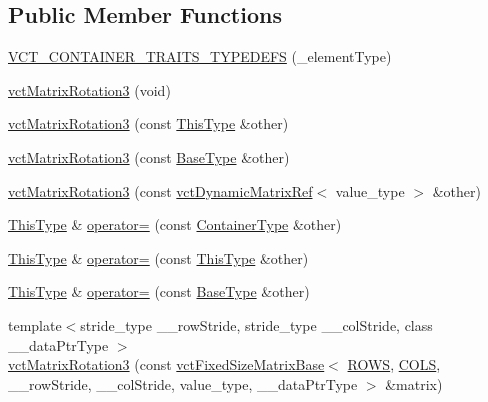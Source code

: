 \subsection*{Public Member Functions}
\begin{DoxyCompactItemize}
\item 
\hyperlink{classvct_matrix_rotation3_adbe5f2fc2338162c07322041a96e7c5c}{V\+C\+T\+\_\+\+C\+O\+N\+T\+A\+I\+N\+E\+R\+\_\+\+T\+R\+A\+I\+T\+S\+\_\+\+T\+Y\+P\+E\+D\+E\+F\+S} (\+\_\+element\+Type)
\item 
\hyperlink{classvct_matrix_rotation3_aa18a0aba9e5afb41c1279492d334cdcc}{vct\+Matrix\+Rotation3} (void)
\item 
\hyperlink{classvct_matrix_rotation3_af4d1ec8d30bccf86b158c2720e8bc735}{vct\+Matrix\+Rotation3} (const \hyperlink{classvct_fixed_size_const_matrix_base_a7ec66a96ed7e08ce9ff54093133c9d8d}{This\+Type} \&other)
\item 
\hyperlink{classvct_matrix_rotation3_a289c3541f606afd5b62b3df5da5f3c45}{vct\+Matrix\+Rotation3} (const \hyperlink{classvct_matrix_rotation3_a548c9a746fae0bfb7b4b1466a872f4dd}{Base\+Type} \&other)
\item 
\hyperlink{classvct_matrix_rotation3_a8c056c071df209ca53bc3ff8cb0a6a56}{vct\+Matrix\+Rotation3} (const \hyperlink{classvct_dynamic_matrix_ref}{vct\+Dynamic\+Matrix\+Ref}$<$ value\+\_\+type $>$ \&other)
\item 
\hyperlink{classvct_fixed_size_const_matrix_base_a7ec66a96ed7e08ce9ff54093133c9d8d}{This\+Type} \& \hyperlink{classvct_matrix_rotation3_aa9706d895d226eae4becea140501217c}{operator=} (const \hyperlink{classvct_matrix_rotation3_a1f8796d5368dbda35c3b57c6395b6dd0}{Container\+Type} \&other)
\item 
\hyperlink{classvct_fixed_size_const_matrix_base_a7ec66a96ed7e08ce9ff54093133c9d8d}{This\+Type} \& \hyperlink{classvct_matrix_rotation3_abc7b9b949adf10b20041c300310c27c9}{operator=} (const \hyperlink{classvct_fixed_size_const_matrix_base_a7ec66a96ed7e08ce9ff54093133c9d8d}{This\+Type} \&other)
\item 
\hyperlink{classvct_fixed_size_const_matrix_base_a7ec66a96ed7e08ce9ff54093133c9d8d}{This\+Type} \& \hyperlink{classvct_matrix_rotation3_adc94623f47cef42a0f55c4991e710cff}{operator=} (const \hyperlink{classvct_matrix_rotation3_a548c9a746fae0bfb7b4b1466a872f4dd}{Base\+Type} \&other)
\item 
{\footnotesize template$<$stride\+\_\+type \+\_\+\+\_\+row\+Stride, stride\+\_\+type \+\_\+\+\_\+col\+Stride, class \+\_\+\+\_\+data\+Ptr\+Type $>$ }\\\hyperlink{classvct_matrix_rotation3_af07f30bca51bba5ee1f57fbbe3c914b8}{vct\+Matrix\+Rotation3} (const \hyperlink{classvct_fixed_size_matrix_base}{vct\+Fixed\+Size\+Matrix\+Base}$<$ \hyperlink{group__cisst_vector_ggac08ca99a9ddb4e59a896f765b4ae95bfa2e2c8802539f04eff93b4598b1fbb362}{R\+O\+W\+S}, \hyperlink{group__cisst_vector_ggac08ca99a9ddb4e59a896f765b4ae95bfa8c935a63b595f6c48177e1213c36f787}{C\+O\+L\+S}, \+\_\+\+\_\+row\+Stride, \+\_\+\+\_\+col\+Stride, value\+\_\+type, \+\_\+\+\_\+data\+Ptr\+Type $>$ \&matrix)
\end{DoxyCompactItemize}
